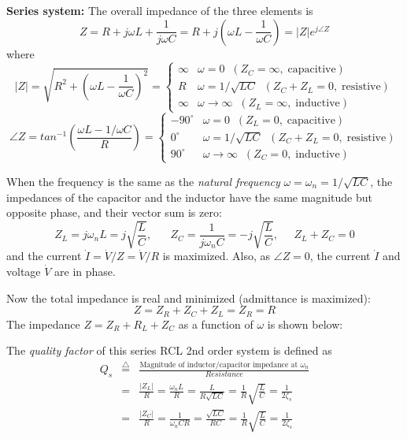 {\bf Series system:} The overall impedance of the three elements is
\[ 
Z=R+j\omega L+\frac{1}{j\omega C}=R+j\left(\omega L-\frac{1}{\omega C}\right)
=|Z|e^{j\angle Z}	
\]
where 
\[ 
|Z|=\sqrt{R^2+\left(\omega L-\frac{1}{\omega C}\right)^2}
=\left\{ \begin{array}{rl} 
\infty & \omega=0\;\; (Z_C=\infty,\;\mbox{capacitive})\\ 
R & \omega=1/\sqrt{LC}\;\; (Z_C+Z_L=0,\;\mbox{resistive})\\
\infty & \omega \rightarrow \infty\;\; (Z_L=\infty,\;\mbox{inductive})
\end{array} \right. 
\]
\[
\angle Z=tan^{-1} \left(\frac{\omega L-1/\omega C}{R}\right)
=\left\{ \begin{array}{rl} -90^\circ & \omega=0\;\; (Z_L=0,\;\mbox{capacitive})\\ 
0^\circ & \omega=1/\sqrt{LC}\;\; (Z_C+Z_L=0,\;\mbox{resistive})\\
90^\circ & \omega \rightarrow \infty\;\; (Z_C=0,\;\mbox{inductive})
\end{array} \right. 
\]


When the frequency is the same as the {\em natural frequency}
$\omega=\omega_n=1/\sqrt{LC}$, the impedances of the capacitor and 
the inductor have the same magnitude but opposite phase, and their 
vector sum is zero:
\[
Z_L=j\omega_nL=j\sqrt{\frac{L}{C}},\;\;\;\;\;\;
Z_C=\frac{1}{j\omega_nC}=-j\sqrt{\frac{L}{C}},\;\;\;\;\;
Z_L+Z_C=0
\]
and the current $\dot{I}=\dot{V}/Z=\dot{V}/R$ is maximized. Also, as
$\angle Z=0$, the current $\dot{I}$ and voltage $\dot{V}$ are in phase. 

Now the total impedance is real and minimized (admittance is maximized):
\[
Z=Z_R+Z_C+Z_L=Z_R=R 
\] 
The impedance $Z=Z_R+R_L+Z_C$ as a function of $\omega$ is shown below:


The {\em quality factor} of this series RCL 2nd order system is defined as
\begin{eqnarray}
  Q_s&\stackrel{\triangle}{=}&\frac{\mbox{Magnitude of inductor/capacitor impedance at $\omega_n$}}{Resistance}
  \nonumber \\
  &=&\frac{|Z_L|}{R}=\frac{\omega_nL}{R}=\frac{L}{R\sqrt{LC}}
  =\frac{1}{R}\sqrt{\frac{L}{C}}=\frac{1}{2\zeta_s}
  \nonumber \\
  &=&\frac{|Z_C|}{R}=\frac{1}{\omega_nCR}=\frac{\sqrt{LC}}{RC}
  =\frac{1}{R}\sqrt{\frac{L}{C}}=\frac{1}{2\zeta_s}
  \nonumber
\end{eqnarray}


